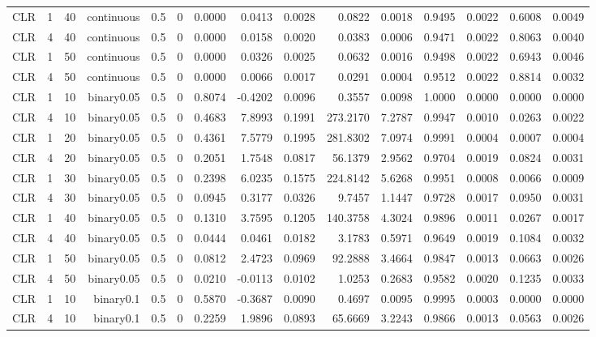 \begin{longtable}{rrrrrrrrrrrrrrr}
  CLR & 1 & 40 & continuous & 0.5 & 0 & 0.0000 & 0.0413 & 0.0028 & 0.0822 & 0.0018 & 0.9495 & 0.0022 & 0.6008 & 0.0049 \\ 
  CLR & 4 & 40 & continuous & 0.5 & 0 & 0.0000 & 0.0158 & 0.0020 & 0.0383 & 0.0006 & 0.9471 & 0.0022 & 0.8063 & 0.0040 \\ 
  CLR & 1 & 50 & continuous & 0.5 & 0 & 0.0000 & 0.0326 & 0.0025 & 0.0632 & 0.0016 & 0.9498 & 0.0022 & 0.6943 & 0.0046 \\ 
  CLR & 4 & 50 & continuous & 0.5 & 0 & 0.0000 & 0.0066 & 0.0017 & 0.0291 & 0.0004 & 0.9512 & 0.0022 & 0.8814 & 0.0032 \\ 
  CLR & 1 & 10 & binary0.05 & 0.5 & 0 & 0.8074 & -0.4202 & 0.0096 & 0.3557 & 0.0098 & 1.0000 & 0.0000 & 0.0000 & 0.0000 \\ 
  CLR & 4 & 10 & binary0.05 & 0.5 & 0 & 0.4683 & 7.8993 & 0.1991 & 273.2170 & 7.2787 & 0.9947 & 0.0010 & 0.0263 & 0.0022 \\ 
  CLR & 1 & 20 & binary0.05 & 0.5 & 0 & 0.4361 & 7.5779 & 0.1995 & 281.8302 & 7.0974 & 0.9991 & 0.0004 & 0.0007 & 0.0004 \\ 
  CLR & 4 & 20 & binary0.05 & 0.5 & 0 & 0.2051 & 1.7548 & 0.0817 & 56.1379 & 2.9562 & 0.9704 & 0.0019 & 0.0824 & 0.0031 \\ 
  CLR & 1 & 30 & binary0.05 & 0.5 & 0 & 0.2398 & 6.0235 & 0.1575 & 224.8142 & 5.6268 & 0.9951 & 0.0008 & 0.0066 & 0.0009 \\ 
  CLR & 4 & 30 & binary0.05 & 0.5 & 0 & 0.0945 & 0.3177 & 0.0326 & 9.7457 & 1.1447 & 0.9728 & 0.0017 & 0.0950 & 0.0031 \\ 
  CLR & 1 & 40 & binary0.05 & 0.5 & 0 & 0.1310 & 3.7595 & 0.1205 & 140.3758 & 4.3024 & 0.9896 & 0.0011 & 0.0267 & 0.0017 \\ 
  CLR & 4 & 40 & binary0.05 & 0.5 & 0 & 0.0444 & 0.0461 & 0.0182 & 3.1783 & 0.5971 & 0.9649 & 0.0019 & 0.1084 & 0.0032 \\ 
  CLR & 1 & 50 & binary0.05 & 0.5 & 0 & 0.0812 & 2.4723 & 0.0969 & 92.2888 & 3.4664 & 0.9847 & 0.0013 & 0.0663 & 0.0026 \\ 
  CLR & 4 & 50 & binary0.05 & 0.5 & 0 & 0.0210 & -0.0113 & 0.0102 & 1.0253 & 0.2683 & 0.9582 & 0.0020 & 0.1235 & 0.0033 \\ 
  CLR & 1 & 10 & binary0.1 & 0.5 & 0 & 0.5870 & -0.3687 & 0.0090 & 0.4697 & 0.0095 & 0.9995 & 0.0003 & 0.0000 & 0.0000 \\ 
  CLR & 4 & 10 & binary0.1 & 0.5 & 0 & 0.2259 & 1.9896 & 0.0893 & 65.6669 & 3.2243 & 0.9866 & 0.0013 & 0.0563 & 0.0026 \\ 

\end{longtable}
